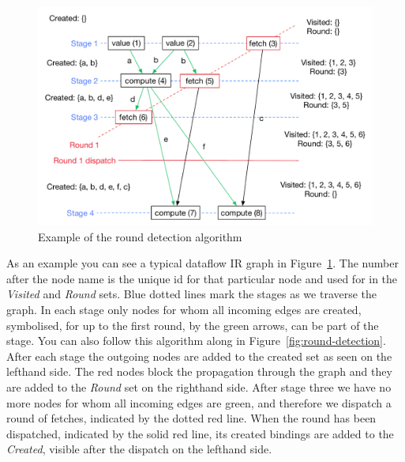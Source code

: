 \begin{figure}
    \includegraphics[width=\linewidth]{../Figures/yauhau-round-detection}
    \caption{Example of the round detection algorithm}
    \label{fig:yauhau-round-detection}
\end{figure}

As an example you can see a typical dataflow IR graph in Figure~\ref{fig:yauhau-round-detection}.
The number after the node name is the unique id for that particular node and used for in the \emph{Visited} and \emph{Round} sets.
Blue dotted lines mark the stages as we traverse the graph.
In each stage only nodes for whom all incoming edges are created, symbolised, for up to the first round, by the green arrows, can be part of the stage.
You can also follow this algorithm along in Figure~\ref{fig:round-detection}.
After each stage the outgoing nodes are added to the created set as seen on the lefthand side.
The red \fetch{} nodes block the propagation through the graph and they are added to the \emph{Round} set on the righthand side.
After stage three we have no more nodes for whom all incoming edges are green, and therefore we dispatch a round of fetches, indicated by the dotted red line.
When the round has been dispatched, indicated by the solid red line, its created bindings are added to the \emph{Created}, visible after the dispatch on the lefthand side.

